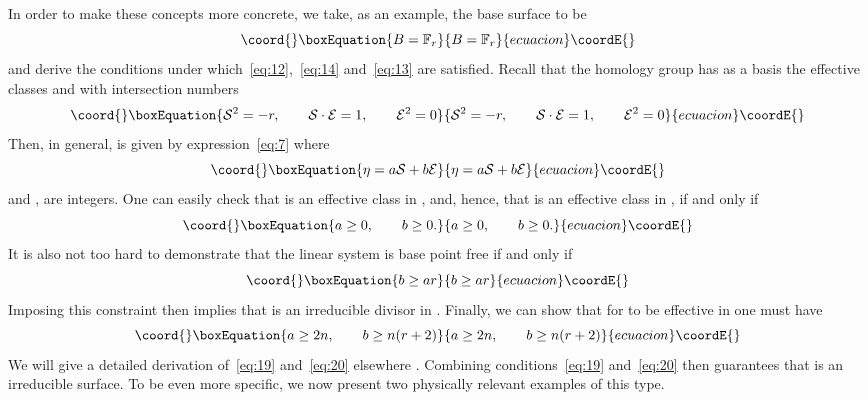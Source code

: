 \documentclass[a4paper,12pt]{article}
\numberwithin{equation}{section}
\def\cC{{\mathcal C}}
\def\cE{{\mathcal E}}
\def\cS{{\mathcal S}}
\theoremstyle{plain}
\begin{document}
In order to make these concepts more concrete, we take, as an example, the
base surface to be
\begin{equation}\coord{}\boxEquation{
B={\mathbb F}_{r}
\label{eq:15}
}{
B={\mathbb F}_{r}
}{ecuacion}\coordE{}\end{equation}
and derive the conditions under  
which~\eqref{eq:12},~\eqref{eq:14} and~\eqref{eq:13}
are satisfied. Recall\cite{don2} that the homology group \coordHE{} has
as a basis the effective classes \myHighlight{$\cS$}\coordHE{} and \myHighlight{$\cE$}\coordHE{} with intersection numbers
\begin{equation}\coord{}\boxEquation{
\cS^{2}=-r, \qquad \cS\cdot \cE=1, \qquad \cE^{2}=0
\label{eq:16}
}{
\cS^{2}=-r, \qquad \cS\cdot \cE=1, \qquad \cE^{2}=0
}{ecuacion}\coordE{}\end{equation}
Then, in general, \myHighlight{$\cC$}\coordHE{} is given by expression~\eqref{eq:7} where
\begin{equation}\coord{}\boxEquation{
\eta= a\cS+b\cE
\label{eq:17}
}{
\eta= a\cS+b\cE
}{ecuacion}\coordE{}\end{equation}
and \coordHE{},\coordHE{} are integers. One can easily check that \myHighlight{$\eta$}\coordHE{} is an effective
class in \coordHE{}, and, hence, that \myHighlight{$\cC$}\coordHE{} is an effective class in
\coordHE{}, if and only if
\begin{equation}\coord{}\boxEquation{
a \geq 0, \qquad b \geq 0.
\label{eq:18}
}{
a \geq 0, \qquad b \geq 0.
}{ecuacion}\coordE{}\end{equation}
It is also not too hard to demonstrate that the linear system \myHighlight{$|\eta|$}\coordHE{} is base
point free if and only if
\begin{equation}\coord{}\boxEquation{
b \geq ar
\label{eq:19}
}{
b \geq ar
}{ecuacion}\coordE{}\end{equation}
Imposing this constraint then implies that \coordHE{} is an irreducible divisor in
\coordHE{}. Finally, we can show that for \coordHE{} to be effective in \coordHE{} one must have
\begin{equation}\coord{}\boxEquation{
a \geq 2n, \qquad b \geq n(r+2)
\label{eq:20}
}{
a \geq 2n, \qquad b \geq n(r+2)
}{ecuacion}\coordE{}\end{equation}
We will give a detailed derivation of~\eqref{eq:19} and~\eqref{eq:20} elsewhere
\cite{mathpaper}. Combining conditions~\eqref{eq:19} 
and~\eqref{eq:20} then guarantees that
\myHighlight{$\cC$}\coordHE{} is an irreducible surface. To be even more specific, we now present 
two physically relevant examples of this type.
\end{document}
